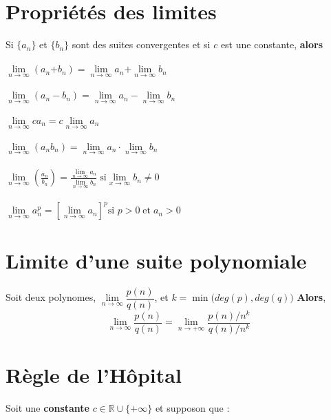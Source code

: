 \documentclass{report}
\begin{document}
\begin{multicols*}{3}
    \section{Propriétés des limites}
        Si $\{a_n\}$ et $\{b_n\}$ sont des suites convergentes et 
        si $c$ est une constante, \textbf{alors} \\\\ 
        $\lim\limits_{n\to\infty  }\left(a_n \text{+} b_n \right) = 
        \lim\limits_{n\to\infty  }a_n \text{+} 
        \lim\limits_{n\to\infty  }b_n$
        \\\\
        $\lim\limits_{n\to\infty  }\left(a_n - b_n \right) = 
        \lim\limits_{n\to\infty  }a_n - \lim\limits_{n\to\infty  }b_n$ 
        \\\\
        $\lim\limits_{n\to\infty  }ca_n = c \lim\limits_{n \to \infty  }a_n$ 
        \\\\
        $\lim\limits_{n\to\infty  }\left(a_nb_n \right) = 
        \lim\limits_{n\to\infty  }a_n \cdot \lim\limits_{n\to\infty  }b_n$
        \\\\
        $\lim\limits_{n\to\infty  }\left(\frac{a_n}{b_n} \right) = 
        \frac{\lim\limits_{n\to\infty  }a_n}{\lim\limits_{n\to\infty  }b_n}
        \;
        \text{si} \lim\limits_{x\to\infty  }b_n \neq 0$
        \\\\
        $\lim\limits_{n\to\infty  }a_n^{p} = 
        \left[\lim\limits_{n\to\infty  }a_n \right]^p \text{si } 
        p > 0 \; \text{et} \; a_n > 0$



    \section{Limite d'une suite polynomiale} 
        Soit deux polynomes,
        $\lim\limits_{n\to \infty } \dfrac{p(n)}{q(n)}$, 
        et 
        $k = \min\bigl(deg(p), deg(q)\bigr)$
        \textbf{Alors},   
        \[ \lim\limits_{n\to \infty } \dfrac{p(n)}{q(n)} =
        \lim\limits_{n\to+\infty}\dfrac{p(n)/{n^k}}{q(n)/n^{k}} \]



    \section{Règle de l'Hôpital}
        Soit une \textbf{constante} $c \in \mathbb{R} \cup \{+\infty\}$ et 
        supposon que : 


\end{multicols*}
\end{document}
